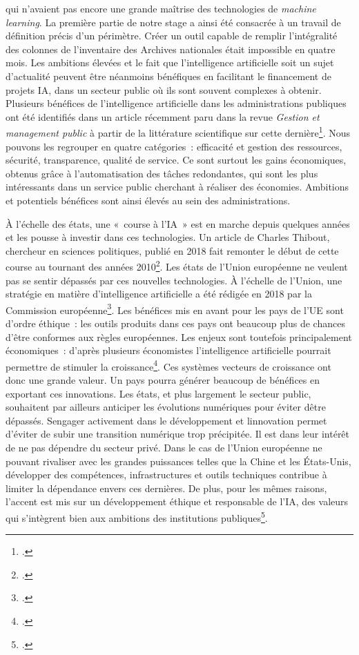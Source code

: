 qui n'avaient pas encore une grande maîtrise des technologies de
\emph{machine learning}. La première partie de notre stage a ainsi été
consacrée à un travail de définition précis d'un périmètre. Créer un outil
capable de remplir l'intégralité des colonnes de l'inventaire des
Archives nationales était impossible en quatre mois. Les ambitions
élevées et le fait que l'intelligence artificielle soit un sujet
d'actualité peuvent être néanmoins bénéfiques en facilitant le
financement de projets IA, dans un secteur public où ils sont souvent complexes
à obtenir. Plusieurs bénéfices de l'intelligence artificielle dans les
administrations publiques ont été identifiés dans un article récemment paru
dans la revue \emph{Gestion et management public} à partir de la
littérature scientifique sur cette dernière\footcite{bertolucci_lintelligence_2024}.
Nous pouvons les regrouper en quatre catégories~: efficacité et gestion
des ressources, sécurité, transparence, qualité de service. Ce sont
surtout les gains économiques, obtenus grâce à l'automatisation des
tâches redondantes, qui sont les plus intéressants dans un service
public cherchant à réaliser des économies. Ambitions et potentiels bénéfices sont
ainsi élevés au sein des administrations.
\newline

À l'échelle des états, une «~course à l'IA~» est en marche depuis
quelques années et les pousse à investir dans ces technologies. Un
article de Charles Thibout, chercheur en sciences politiques, publié en
2018 fait remonter le début de cette course au tournant des années
2010\footcite{thibout_intelligence_2019}.
Les états de l'Union européenne ne veulent pas se sentir dépassés par
ces nouvelles technologies. À l'échelle de l'Union, une stratégie en
matière d'intelligence artificielle a été rédigée en 2018 par la
Commission européenne\footcite{noauthor_communication_2018}. Les bénéfices mis en avant pour les pays de
l'UE sont d'ordre éthique~: les outils produits dans ces pays ont
beaucoup plus de chances d'être conformes aux règles européennes. Les enjeux
sont toutefois principalement économiques~: d'après plusieurs économistes
l'intelligence artificielle pourrait permettre de stimuler la
croissance\footcite{aghion_intelligence_2019}. Ces systèmes
vecteurs de croissance ont donc une grande valeur. Un pays pourra générer
beaucoup de bénéfices en exportant ces innovations. Les états, et
plus largement le secteur public, souhaitent par ailleurs anticiper les
évolutions numériques pour éviter d\textquotesingle être dépassés. S\textquotesingle engager activement dans le développement et
l\textquotesingle innovation permet d'éviter de subir une transition numérique trop
précipitée. Il est dans leur intérêt de ne pas dépendre du secteur
privé. Dans le cas de l'Union européenne ne pouvant rivaliser avec les
grandes puissances telles que la Chine et les États-Unis, développer des
compétences, infrastructures et outils techniques contribue à limiter la
dépendance envers ces dernières. De plus, pour les mêmes raisons, l'accent est mis sur un développement éthique et responsable de l'IA,
des valeurs qui s'intègrent bien aux ambitions des institutions
publiques\footcite{smuha_race_2021}.

